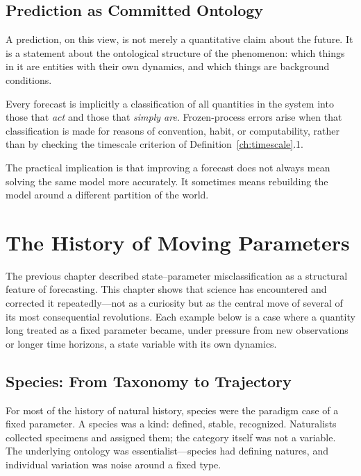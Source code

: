 \documentclass[11pt]{book}
\theoremstyle{plain}
\theoremstyle{definition}
\theoremstyle{remark}
\begin{document}
\section{Prediction as Committed Ontology}

A prediction, on this view, is not merely a quantitative claim about the future. It is a statement about the ontological structure of the phenomenon: which things in it are entities with their own dynamics, and which things are background conditions.

\begin{tcolorbox}[title={Prediction as Ontology}]
Every forecast is implicitly a classification of all quantities in the system into those that \emph{act} and those that \emph{simply are}. Frozen-process errors arise when that classification is made for reasons of convention, habit, or computability, rather than by checking the timescale criterion of Definition~\ref{ch:timescale}.1.
\end{tcolorbox}

The practical implication is that improving a forecast does not always mean solving the same model more accurately. It sometimes means rebuilding the model around a different partition of the world.

\chapter{The History of Moving Parameters}
\label{ch:history}

The previous chapter described state--parameter misclassification as a structural feature of forecasting. This chapter shows that science has encountered and corrected it repeatedly---not as a curiosity but as the central move of several of its most consequential revolutions. Each example below is a case where a quantity long treated as a fixed parameter became, under pressure from new observations or longer time horizons, a state variable with its own dynamics.

\section{Species: From Taxonomy to Trajectory}

For most of the history of natural history, species were the paradigm case of a fixed parameter. A species was a kind: defined, stable, recognized. Naturalists collected specimens and assigned them; the category itself was not a variable. The underlying ontology was essentialist---species had defining natures, and individual variation was noise around a fixed type.
\end{document}
